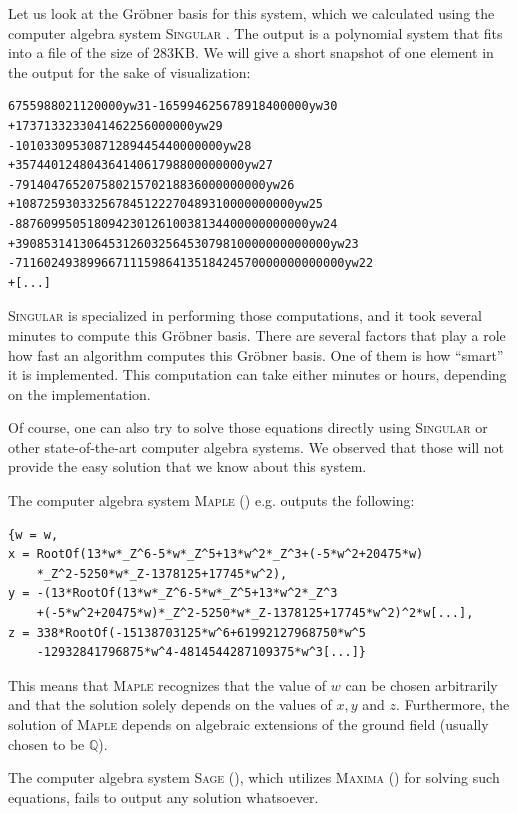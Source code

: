 \documentclass[oribibl, twocolumn]{llncs}
\newcommand{\QQ}{{\mathbb{Q}}}
\begin{document}
Let us look at the Gr\"obner basis for this system, which we
calculated using the computer algebra system \textsc{Singular}
\cite{Singular:2012}. The output is a polynomial system that fits into
a file of the size of 283KB. We will give a short snapshot of one
element in the output for the sake of visualization:

\begin{verbatim}
6755988021120000yw31-165994625678918400000yw30
+1737133233041462256000000yw29
-10103309530871289445440000000yw28
+35744012480436414061798800000000yw27
-79140476520758021570218836000000000yw26
+108725930332567845122270489310000000000yw25
-88760995051809423012610038134400000000000yw24
+39085314130645312603256453079810000000000000yw23
-7116024938996671115986413518424570000000000000yw22
+[...]
\end{verbatim}

\textsc{Singular} is specialized in performing those computations, and
it took several minutes to compute this Gr\"obner basis. There are
several factors that play a role how fast an algorithm computes this
Gr\"obner basis. One of them is how ``smart'' it is implemented. This
computation can take either minutes or hours, depending on the implementation.

Of course, one can also try to solve those equations directly using \textsc{Singular} or other 
state-of-the-art computer algebra systems. We observed that those will
not provide the easy solution that we know about this system.

The computer algebra system \textsc{Maple} (\cite{Maple}) e.g. outputs the following:
\begin{verbatim}
{w = w,
x = RootOf(13*w*_Z^6-5*w*_Z^5+13*w^2*_Z^3+(-5*w^2+20475*w)
    *_Z^2-5250*w*_Z-1378125+17745*w^2),
y = -(13*RootOf(13*w*_Z^6-5*w*_Z^5+13*w^2*_Z^3
    +(-5*w^2+20475*w)*_Z^2-5250*w*_Z-1378125+17745*w^2)^2*w[...],
z = 338*RootOf(-15138703125*w^6+61992127968750*w^5
    -12932841796875*w^4-4814544287109375*w^3[...]}
\end{verbatim}

This means that \textsc{Maple} recognizes that the value of $w$ can be
chosen arbitrarily and that the solution solely depends on the values
of $x,y$ and $z$. Furthermore, the solution of \textsc{Maple}
depends on algebraic extensions of the ground field (usually chosen to
be $\QQ$).

The computer algebra system \textsc{Sage} (\cite{sage}), which utilizes
\textsc{Maxima} (\cite{maxima}) for solving such equations, fails to
output any solution whatsoever.
\end{document}
